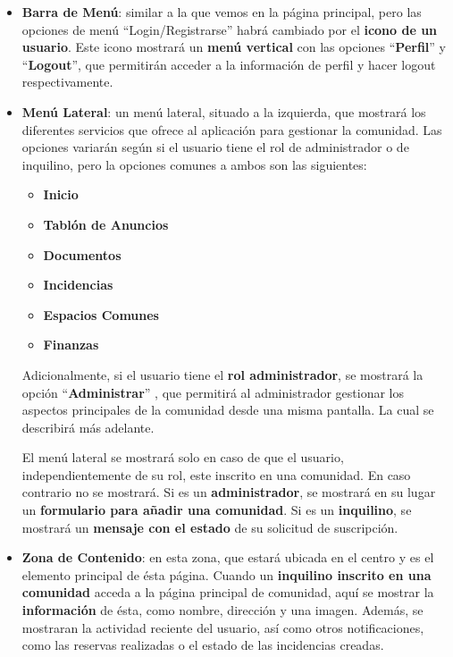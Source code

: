 \begin{appendices}
\begin{itemize}
	\begin{itemize}
		\item \textbf{Barra de Menú}: similar a la que vemos en la página principal, pero las opciones de menú ``Login/Registrarse''  habrá cambiado por el \textbf{icono de un usuario}. Este icono mostrará un \textbf{menú vertical} con las opciones ``\textbf{Perfil}'' y ``\textbf{Logout}'', que permitirán acceder a la información de perfil y hacer \gls{logout} respectivamente.
		
		\item \textbf{Menú Lateral}: un menú lateral, situado a la izquierda, que mostrará los diferentes servicios que ofrece al aplicación para gestionar la comunidad. Las opciones variarán según si el usuario tiene el rol de administrador o de inquilino, pero la opciones comunes a ambos son las siguientes: 
		
		\begin{itemize}
			\item \textbf{Inicio}
			\item \textbf{Tablón de Anuncios}
			\item \textbf{Documentos}
			\item \textbf{Incidencias}
			\item \textbf{Espacios Comunes}
			\item \textbf{Finanzas}
		\end{itemize}
	
		 
		 Adicionalmente, si el usuario tiene el \textbf{rol administrador}, se mostrará la opción ``\textbf{Administrar}''	, que permitirá al administrador gestionar los aspectos principales de la comunidad desde una misma pantalla. La cual se describirá más adelante.
		 
		El menú lateral se mostrará solo en caso de que el usuario, independientemente de su rol, este inscrito en una comunidad. En caso contrario no se mostrará. Si es un \textbf{administrador}, se mostrará en su lugar un \textbf{formulario para añadir una comunidad}. Si es un \textbf{inquilino}, se mostrará un \textbf{mensaje con el estado} de su solicitud de suscripción.
		
		\item \textbf{Zona de Contenido}: en esta zona, que estará ubicada en el centro y es el elemento principal de ésta página. Cuando un \textbf{inquilino inscrito en una comunidad} acceda a la página principal de comunidad, aquí se mostrar la \textbf{información} de ésta, como nombre, dirección y una imagen. Además, se mostraran la actividad reciente del usuario, así como otros notificaciones, como las reservas realizadas o el estado de las incidencias creadas.
		

\end{itemize}
\end{itemize}
\end{appendices}
